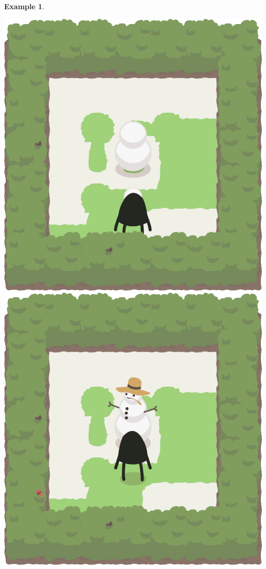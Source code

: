 \documentclass{report}
\theoremstyle{plain}
\newtheorem{example}{Example}[section]
\begin{document}
\begin{example}
\begin{center}
\includegraphics[width=\andyWidth\textwidth]{andy-basic-19.png} \quad
\includegraphics[width=\andyWidth\textwidth]{andy-basic-20.png}

\end{center}
\end{example}
\end{document}
